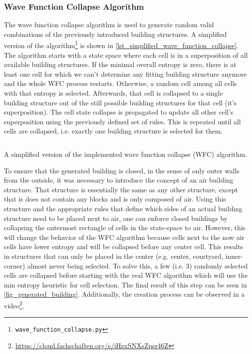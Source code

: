 \documentclass[
oneside,
fontsize=11pt
]{scrartcl}
\begin{document}
\subsubsection{Wave Function Collapse Algorithm}
The wave function collapse algorithm \cite{WFC_GitHub} 
is used to generate random valid combinations of the previously introduced building structures.
A simplified version of the algorithm\footnote{\texttt{wave\_function\_collapse.py}} 
is shown in \autoref{lst_simplified_wave_function_collapse}.
The algorithm starts with a state space where each cell is in a superposition of all available building structures.
If the minimal overall entropy is zero, there is at least one cell for which we can't determine 
any fitting building structure anymore and the whole WFC process restarts. 
Otherwise, a random cell among all cells with that entropy is selected. 
Afterwards, that cell is collapsed to a single building structure out of the still 
possible building structures for that cell (it's superposition).
The cell state collapse is propagated to update all other cell's superposition
using the previously defined set of rules. 
This is repeated until all cells are collapsed, i.e. 
exactly one building structure is selected for them.

\begin{listing}[ht]
  \inputminted[baselinestretch=0.55,linenos,breaklines]{python}{listings/wave_function_collapse_simplified.py}
  \caption{A simplified version of the implemented wave function collapse (WFC) algorithm.}    
  \label{lst_simplified_wave_function_collapse}
\end{listing}

To ensure that the generated building is closed, 
in the sense of only outer walls from the outside, 
it was necessary to introduce the concept of an air building structure. 
That structure is essentially the same as any other structure, 
except that is does not contain any blocks and is only composed of air. 
Using this structure and the appropriate rules that define which sides 
of an actual building structure need to be placed next to air, 
one can enforce closed buildings by collapsing the outermost rectangle 
of cells in the state-space to air.
However, this will change the behavior of the WFC algorithm
because cells next to the now air cells have lower entropy 
and will be collapsed before any center cell.
This results in structures that can only be placed in the center
(e.g. center, courtyard, inner-corner)
almost never being selected. 
To solve this, a few (i.e. 3) randomly selected cells are collapsed 
before starting with the real WFC algorithm which will 
use the min entropy heuristic for cell selection.
The final result of this step can be seen in \autoref{fig_generated_building}.
Additionally, the creation process can be observed in a video\footnote{\url{https://cloud.fachschaften.org/s/iHzxSNXsZpsr46Z}}.
\end{document}
